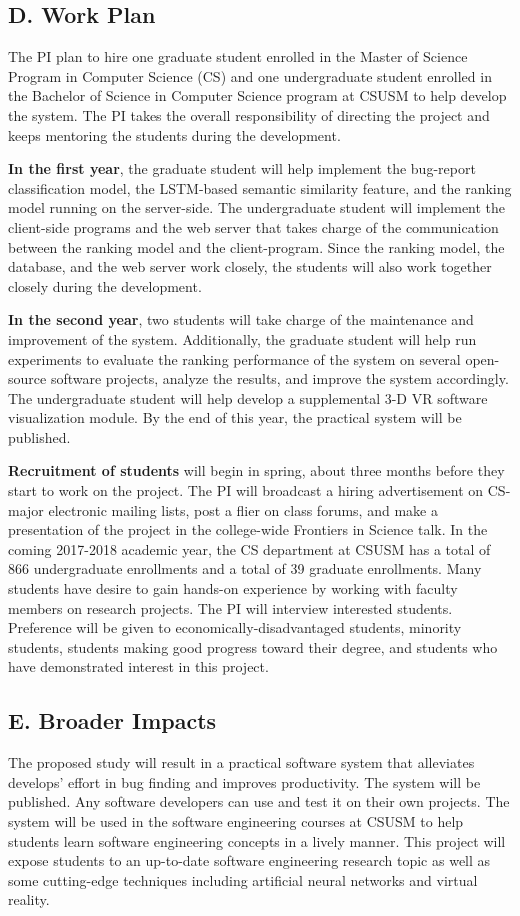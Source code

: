 \subsection{D. Work Plan}
The PI plan to hire one graduate student enrolled in the Master of Science Program in Computer Science (CS) and one undergraduate student enrolled in the Bachelor of Science in Computer Science program at CSUSM to help develop the system. The PI takes the overall responsibility of directing the project and keeps mentoring the students during the development.

\textbf{In the first year}, the graduate student will help implement the bug-report classification model, the LSTM-based semantic similarity feature, and the ranking model running on the server-side. The undergraduate student will implement the client-side programs and the web server that takes charge of the communication between the ranking model and the client-program. Since the ranking model, the database, and the web server work closely, the students will also work together closely during the development.

\textbf{In the second year}, two students will take charge of the maintenance and improvement of the system. Additionally, the graduate student will help run experiments to evaluate the ranking performance of the system on several open-source software projects, analyze the results, and improve the system accordingly. The undergraduate student will help develop a supplemental 3-D VR software visualization module. By the end of this year, the practical system will be published.

\textbf{Recruitment of students} will begin in spring, about three months before they start to work on the project. The PI will broadcast a hiring advertisement on CS-major electronic mailing lists, post a flier on class forums, and make a presentation of the project in the college-wide Frontiers in Science talk. In the coming 2017-2018 academic year, the CS department at CSUSM has a total of 866 undergraduate enrollments and a total of 39 graduate enrollments. Many students have desire to gain hands-on experience by working with faculty members on research projects. The PI will interview interested students. Preference will be given to economically-disadvantaged students, minority students, students making good progress toward their degree, and students who have demonstrated interest in this project.

\subsection{E. Broader Impacts}
The proposed study will result in a practical software system that alleviates develops' effort in bug finding and improves productivity. The system will be published. Any software developers can use and test it on their own projects. The system will be used in the software engineering courses at CSUSM to help students learn software engineering concepts in a lively manner. This project will expose students to an up-to-date software engineering research topic as well as some cutting-edge techniques including artificial neural networks and virtual reality.

